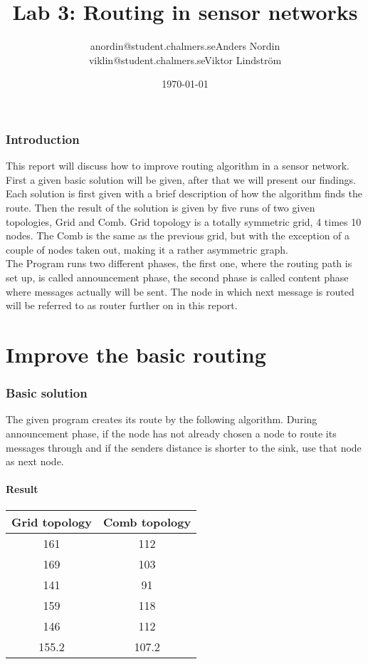 \documentclass{article}
\title{Lab 3: Routing in sensor networks}
\author{anordin@student.chalmers.se\quad Anders Nordin\\
        viklin@student.chalmers.se\quad Viktor Lindstr\"{o}m}
\date{\today}
\begin{document}
\maketitle
\newpage
\tableofcontents
\newpage
\section{Introduction}
  This report will discuss how to improve routing algorithm in a sensor network.
  First a given basic solution will be given, after that
  we will present our findings. Each solution is first given with
  a brief description of how the algorithm finds the route. Then the
  result of the solution is given by five runs of two given topologies,
  Grid and Comb. Grid topology is a totally symmetric grid, 4 times 10 nodes.
  The Comb is the same as the previous grid, but with the exception of
  a couple of nodes taken out, making it a rather asymmetric graph.\\
  The Program runs two different phases, the first one, where the routing path is set up, is called announcement phase, the second phase is called content phase where
  messages actually will be sent. The node in which next message
  is routed will be referred to as router further on in this report.
\part{Improve the basic routing}
\section{Basic solution}
  The given program creates its route by the following algorithm.
  During announcement phase, if the node has not already chosen a 
  node to route its messages through and if the senders distance is shorter
  to the sink, use that node as next node.
  \subsection{Result}
    \begin{tabular}{c|c}
      Grid topology & Comb topology\\
      \hline
      \hline
      161 & 112\\
      169 & 103\\
      141 & 91\\
      159 & 118\\
      146 & 112\\
      \hline
      155.2&107.2\\
    \end{tabular}
\end{document}
